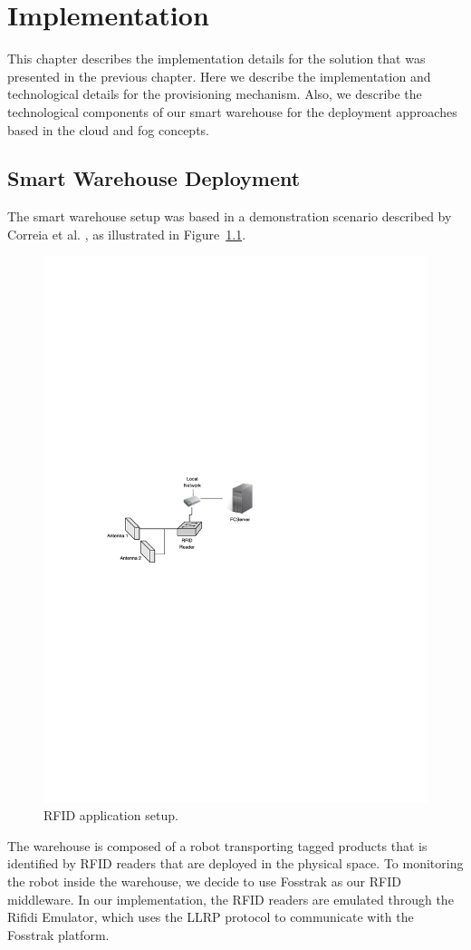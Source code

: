 
\chapter{Implementation}
\label{chapter:implementation}
This chapter describes the implementation details for the solution that was presented in the previous
chapter. Here we describe the implementation and technological details for the provisioning mechanism.
Also, we describe the technological components of our smart warehouse for the deployment approaches
based in the cloud and fog concepts.

\section{Smart Warehouse Deployment}
\label{sec:impl_smart_place}
The smart warehouse setup was based in a demonstration scenario described by Correia et al. \cite{correiaalpharfid},
as illustrated in Figure~\ref{fig:rfidapp_setup}.\\

\begin{figure}[ht!]
  \centering
  \includegraphics[width=.6\textwidth]{./images/rfidapp_setup}
  \caption[RFID application setup.]{RFID application setup.}
  \label{fig:rfidapp_setup}
\end{figure}

The warehouse is composed of a robot transporting tagged products that is identified by \gls{RFID} readers
that are deployed in the physical space. To monitoring the robot inside the warehouse, we decide to
use Fosstrak as our \gls{RFID} middleware. In our implementation, the \gls{RFID} readers are emulated
through the Rifidi Emulator, which uses the \gls{LLRP} protocol to communicate with the Fosstrak
platform.

